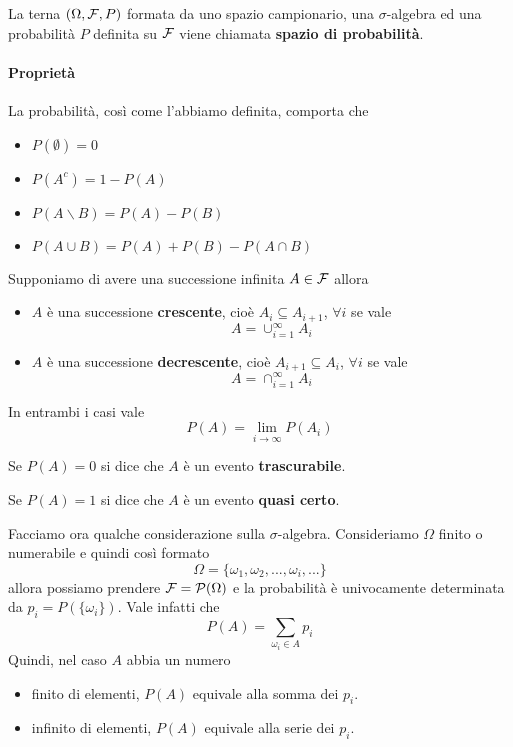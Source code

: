 \begin{definition}
	La terna $(\Omega, \mathcal{F}, P)$ formata da uno spazio campionario, una $\sigma$-algebra ed una
	probabilità $P$ definita su $\mathcal{F}$ viene chiamata \textbf{spazio di probabilità}.
\end{definition}

\paragraph{Proprietà} La probabilità, così come l'abbiamo definita, comporta che
\begin{itemize}
	\item $P(\emptyset) = 0$
	\item $P(A^c) = 1 - P(A)$
	\item $P(A \backslash B) = P(A) - P(B)$
	\item $P(A \cup B) = P(A) + P(B) - P(A \cap B)$
\end{itemize}

\begin{proposition}
	Supponiamo di avere una successione infinita $A \in \mathcal{F}$	allora
	\begin{itemize}
		\item $A$ è una successione \textbf{crescente}, cioè $A_i \subseteq A_{i+1}$, $\forall i$
			se vale
			\[ A = \cup_{i=1}^\infty A_i \]
		\item $A$ è una successione \textbf{decrescente}, cioè $A_{i+1} \subseteq A_i$,
			$\forall i$ se vale 
			\[ A = \cap_{i=1}^\infty A_i \]
	\end{itemize}
	In entrambi i casi vale 
	\[ P(A) = \lim_{i \to \infty} P(A_i) \]
\end{proposition}

\begin{definition}
	Se $P(A) = 0$ si dice che $A$ è un evento \textbf{trascurabile}.
\end{definition}

\begin{definition}
	Se $P(A) = 1$ si dice che $A$ è un evento \textbf{quasi certo}.
\end{definition}

Facciamo ora qualche considerazione sulla $\sigma$-algebra. Consideriamo $\Omega$ finito o
numerabile e quindi così formato
\[ \Omega = \{ \omega_1, \omega_2, ..., \omega_i, ... \} \]
allora possiamo prendere $\mathcal{F} = \mathcal{P}(\Omega)$ e la probabilità è univocamente determinata
da $p_i = P(\{ \omega_i \})$. Vale infatti che 
\[ P(A) = \sum_{\omega_i \in A} p_i \]
Quindi, nel caso $A$ abbia un numero 
\begin{itemize}
	\item finito di elementi, $P(A)$ equivale alla somma dei $p_i$.
	\item infinito di elementi, $P(A)$ equivale alla serie dei $p_i$.
\end{itemize}

